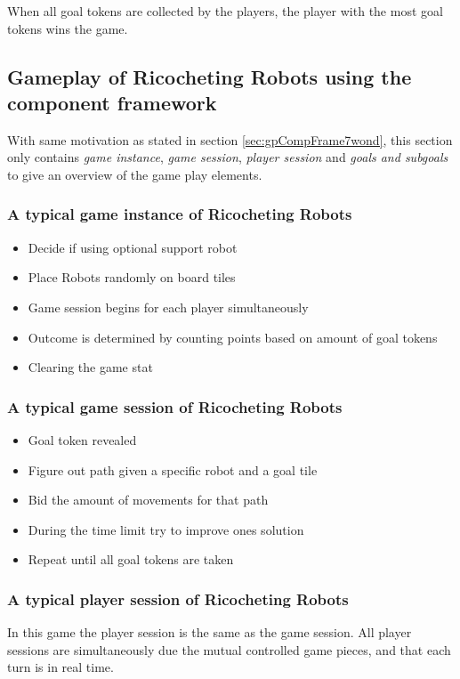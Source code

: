 \documentclass[a4paper]{article}
\begin{document}
When all goal tokens are collected by the players, the player with the most goal tokens wins the game.

\subsection{Gameplay of Ricocheting Robots using the component framework}
\label{sec:gpCompFrameRR}
With same motivation as stated in section \ref{sec:gpCompFrame7wond}, this section only contains \textit{game instance}, \textit{game session}, \textit{player session} and \textit{goals and subgoals} to give an overview of the game play elements.

\subsubsection{A typical game instance of Ricocheting Robots}
\begin{itemize}[noitemsep,topsep=0pt,parsep=0pt,partopsep=0pt]
  \item Decide if using optional support robot
  \item Place Robots randomly on board tiles
  \item Game session begins for each player simultaneously
  \item Outcome is determined by counting points based on amount of goal tokens
  \item Clearing the game stat
\end{itemize}

\subsubsection{A typical game session of Ricocheting Robots}
\begin{itemize}[noitemsep,topsep=0pt,parsep=0pt,partopsep=0pt]
  \item Goal token revealed
  \item Figure out path given a specific robot and a goal tile
  \item Bid the amount of movements for that path
  \item During the time limit try to improve ones solution
  \item Repeat until all goal tokens are taken
\end{itemize}

\subsubsection{A typical player session of Ricocheting Robots}
In this game the player session is the same as the game session. All player sessions are simultaneously due the mutual controlled game pieces, and that each turn is in real time.
\end{document}

